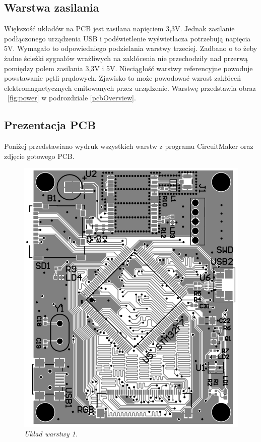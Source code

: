 \documentclass[eng,printmode]{mgr}
\begin{document}
\subsection*{Warstwa zasilania}
Większość układów na PCB jest zasilana napięciem 3,3V. Jednak zasilanie podłączonego urządzenia USB i podświetlenie wyświetlacza potrzebują napięcia 5V. Wymagało to odpowiedniego podzielania warstwy trzeciej. Zadbano o to żeby żadne ścieżki sygnałów wrażliwych na zakłócenia nie przechodziły nad przerwą pomiędzy polem zasilania 3,3V i 5V. Nieciągłość warstwy referencyjne powoduje powstawanie pętli prądowych. Zjawisko to może powodować wzrost zakłóceń elektromagnetycznych emitowanych przez urządzenie. Warstwę przedstawia obraz ~\ref{fig:power} w podrozdziale \ref{pcbOverview}.

\subsection*{Prezentacja PCB} \label{pcbOverview}
Poniżej przedstawiano wydruk wszystkich warstw z programu CircuitMaker oraz zdjęcie gotowego PCB.
\begin{center}\centering
\begin{figure}[!h]
    \centering
    \includegraphics[width=\textwidth]{pcb/top.png}
    \caption{\textit{Układ warstwy 1.}}
\end{figure}
\end{center}
\end{document}
